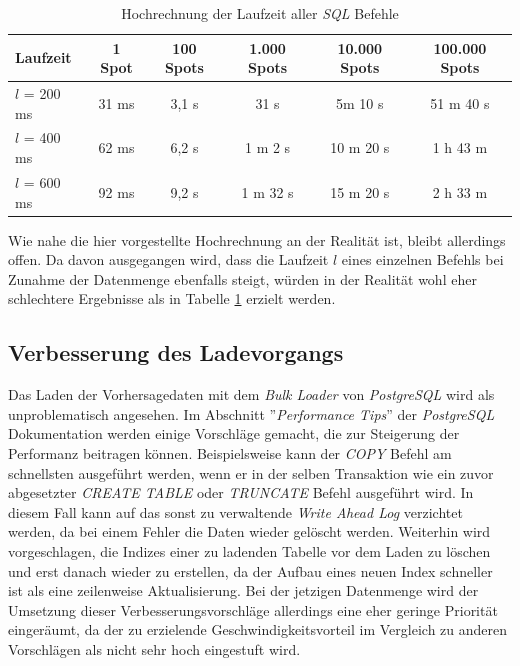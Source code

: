 \begin{table}[h]
  \centering
  {\sf
    \footnotesize
    \begin{longtable}{l|c|c|c|c|c}

      \toprule
      \textbf{Laufzeit} & \textbf{1 Spot} & \textbf{100 Spots} & \textbf{1.000 Spots} & \textbf{10.000 Spots} & \textbf{100.000 Spots} \\
      \midrule
      $l$ = 200 ms & 31 ms & 3,1 s & 31 s &  5m 10 s &  51 m 40 s \\
      $l$ = 400 ms & 62 ms & 6,2 s & 1 m 2 s & 10 m 20 s & 1 h 43 m \\
      $l$ = 600 ms & 92 ms & 9,2 s & 1 m 32 s & 15 m 20 s & 2 h 33 m \\
      \bottomrule

    \end{longtable}
  }

  \caption{Hochrechnung der Laufzeit aller \textit{SQL} Befehle}
  \label{tab:sql_laufzeit}

\end{table}

Wie nahe die hier vorgestellte Hochrechnung an der Realität ist,
bleibt allerdings offen. Da davon ausgegangen wird, dass die Laufzeit
$l$ eines einzelnen Befehls bei Zunahme der Datenmenge ebenfalls
steigt, würden in der Realität wohl eher schlechtere Ergebnisse als in
Tabelle \ref{tab:sql_laufzeit} erzielt werden.

\subsection{Verbesserung des Ladevorgangs}
Das Laden der Vorhersagedaten mit dem \textit{Bulk Loader} von
\textit{PostgreSQL} wird als unproblematisch angesehen. Im Abschnitt
''\textit{Performance Tips}'' \cite{postgresql:performance} der
\textit{PostgreSQL} Dokumentation werden einige Vorschläge gemacht,
die zur Steigerung der Performanz beitragen können. Beispielsweise
kann der \textit{COPY} Befehl am schnellsten ausgeführt werden, wenn
er in der selben Transaktion wie ein zuvor abgesetzter \textit{CREATE
  TABLE} oder \textit{TRUNCATE} Befehl ausgeführt wird. In diesem Fall
kann auf das sonst zu verwaltende \textit{Write Ahead Log} verzichtet
werden, da bei einem Fehler die Daten wieder gelöscht
werden. Weiterhin wird vorgeschlagen, die Indizes einer zu ladenden
Tabelle vor dem Laden zu löschen und erst danach wieder zu erstellen,
da der Aufbau eines neuen Index schneller ist als eine zeilenweise
Aktualisierung. Bei der jetzigen Datenmenge wird der Umsetzung dieser
Verbesserungsvorschläge allerdings eine eher geringe Priorität
eingeräumt, da der zu erzielende Geschwindigkeitsvorteil im Vergleich
zu anderen Vorschlägen als nicht sehr hoch eingestuft wird.

